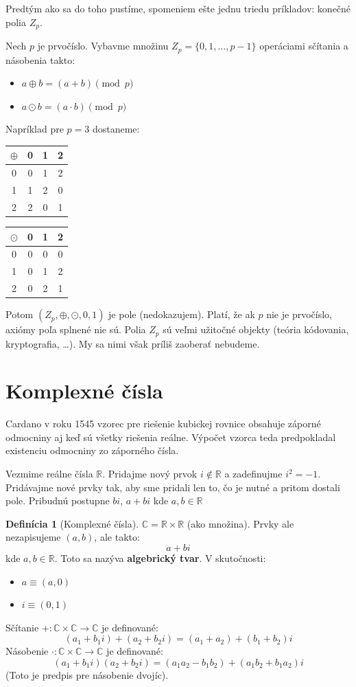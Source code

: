 \documentclass[11pt,a4paper]{article}
\theoremstyle{definition}
\newtheorem{definicia}{Definícia}[section]
\theoremstyle{plain}
\theoremstyle{remark}
\newcommand{\R}{\mathbb{R}}
\begin{document}
Predtým ako sa do toho pustíme, spomeniem ešte jednu triedu príkladov: konečné polia $Z_p$.

Nech $p$ je prvočíslo. Vybavme množinu $Z_p = \{0, 1, \dots, p-1\}$ operáciami sčítania a násobenia takto:
\begin{itemize}
    \item $a \oplus b = (a+b) \pmod p$
    \item $a \odot b = (a \cdot b) \pmod p$
\end{itemize}

Napríklad pre $p=3$ dostaneme:

\begin{center}
\begin{tabular}{c|ccc}
$\oplus$ & 0 & 1 & 2 \\
\hline
0 & 0 & 1 & 2 \\
1 & 1 & 2 & 0 \\
2 & 2 & 0 & 1
\end{tabular}
\hspace{2cm}
\begin{tabular}{c|ccc}
$\odot$ & 0 & 1 & 2 \\
\hline
0 & 0 & 0 & 0 \\
1 & 0 & 1 & 2 \\
2 & 0 & 2 & 1
\end{tabular}
\end{center}

Potom $(Z_p, \oplus, \odot, 0, 1)$ je pole (nedokazujem). Platí, že ak $p$ nie je
prvočíslo, axiómy poľa splnené nie sú.  Polia $Z_p$ sú veľmi užitočné objekty (teória
kódovania, kryptografia, \dots). My sa nimi však príliš zaoberať nebudeme.

\section{Komplexné čísla}

Cardano v roku 1545 vzorec pre riešenie kubickej rovnice obsahuje záporné odmocniny
aj keď sú všetky riešenia reálne. Výpočet vzorca teda predpokladal existenciu
odmocniny zo záporného čísla.

Vezmime reálne čísla $\R$. Pridajme nový prvok $i \notin \R$ a zadefinujme $i^2 =
-1$. Pridávajme nové prvky tak, aby sme pridali len to, čo je nutné a pritom dostali
pole. Pribudnú postupne $bi$, $a+bi$ kde $a, b \in \R$

\begin{definicia}[Komplexné čísla]
$\mathbb{C} = \R \times \R$ (ako množina). Prvky ale nezapisujeme $(a, b)$, ale takto:
$$ a + bi $$
kde $a, b \in \R$. Toto sa nazýva \textbf{algebrický tvar}.
V skutočnosti:
\begin{itemize}
    \item $a \equiv (a, 0)$
    \item $i \equiv (0, 1)$
\end{itemize}
Sčítanie $+: \mathbb{C} \times \mathbb{C} \to \mathbb{C}$ je definované:
$$ (a_1 + b_1 i) + (a_2 + b_2 i) = (a_1 + a_2) + (b_1 + b_2)i $$
Násobenie $\cdot: \mathbb{C} \times \mathbb{C} \to \mathbb{C}$ je definované:
$$ (a_1 + b_1 i)(a_2 + b_2 i) = (a_1 a_2 - b_1 b_2) + (a_1 b_2 + b_1 a_2)i $$
(Toto je predpis pre násobenie dvojíc).
\end{definicia}
\end{document}
